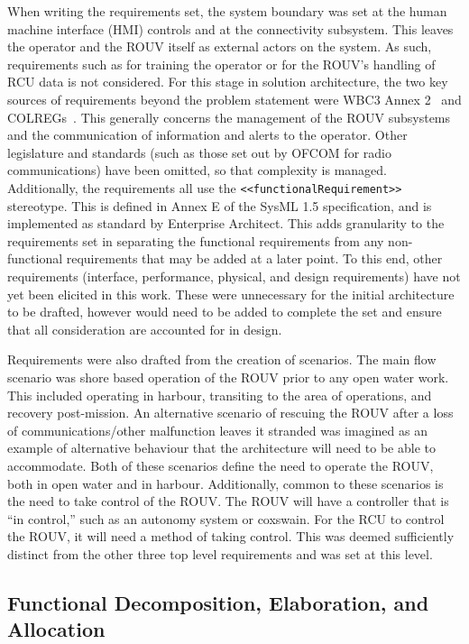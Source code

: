 \documentclass[../main.tex]{subfiles}
\begin{document}
When writing the requirements set, the system boundary was set at the human machine interface (HMI) controls and at the connectivity subsystem.
This leaves the operator and the ROUV itself as external actors on the system.
As such, requirements such as for training the operator or for the ROUV's handling of RCU data is not considered.
For this stage in solution architecture, the two key sources of requirements beyond the problem statement were WBC3 Annex 2~\cite{WBC3} and COLREGs~\cite{COLREGS1972}.
This generally concerns the management of the ROUV subsystems and the communication of information and alerts to the operator.
Other legislature and standards (such as those set out by OFCOM for radio communications) have been omitted, so that complexity is managed.
Additionally, the requirements all use the \texttt{<<functionalRequirement>>} stereotype.  
This is defined in Annex E of the SysML 1.5 specification, and is implemented as standard by Enterprise Architect.
This adds granularity to the requirements set in separating the functional requirements from any non-functional requirements that may be added at a later point.
To this end, other requirements (interface, performance, physical, and design requirements) have not yet been elicited in this work.
These were unnecessary for the initial architecture to be drafted, however would need to be added to complete the set and ensure that all consideration are accounted for in design.

Requirements were also drafted from the creation of scenarios.
The main flow scenario was shore based operation of the ROUV prior to any open water work.
This included operating in harbour, transiting to the area of operations, and recovery post-mission.
An alternative scenario of rescuing the ROUV after a loss of communications/other malfunction leaves it stranded was imagined as an example of alternative behaviour that the architecture will need to be able to accommodate.
Both of these scenarios define the need to operate the ROUV, both in open water and in harbour.
Additionally, common to these scenarios is the need to take control of the ROUV\@.
The ROUV will have a controller that is ``in control,'' such as an autonomy system or coxswain.
For the RCU to control the ROUV, it will need a method of taking control.
This was deemed sufficiently distinct from the other three top level requirements and was set at this level.

\subsection{Functional Decomposition, Elaboration, and Allocation}\label{2.2}
\end{document}
